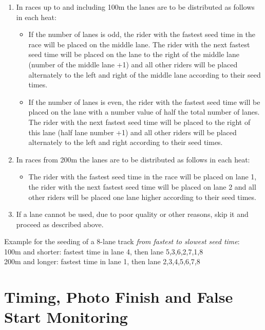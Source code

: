 \begin{enumerate}[leftmargin=1.5em,labelsep=*]
\item In races up to and including 100m the lanes are to be distributed as follows in each heat:
	\begin{itemize}
		\item[$-$] If the number of lanes is odd, the rider with the fastest seed time in the race will be placed on the middle lane.
		The rider with the next fastest seed time will be placed on the lane to the right of the middle lane (number of the middle lane +1) and all other riders will be placed alternately to the left and right of the middle lane according to their seed times.
		\item[$-$] If the number of lanes is even, the rider with the fastest seed time will be placed on the lane with a number value of half the total number of lanes.
		The rider with the next fastest seed time will be placed to the right of this lane (half lane number +1) and all other riders will be placed alternately to the left and right according to their seed times.
	\end{itemize}
	\item In races from 200m the lanes are to be distributed as follows in each heat:
	\begin{itemize}
		\item[$-$] The rider with the fastest seed time in the race will be placed on lane 1, the rider with the next fastest seed time will be placed on lane 2 and all other riders will be placed one lane higher according to their seed times.
	\end{itemize}
	\item If a lane cannot be used, due to poor quality or other reasons, skip it and proceed as described above.
\end{enumerate}

Example for the seeding of a 8-lane track \textit{from fastest to slowest seed time}:\\
100m and shorter: fastest time in lane 4, then lane 5,3,6,2,7,1,8\\
200m and longer: fastest time in lane 1, then lane 2,3,4,5,6,7,8

\section{Timing, Photo Finish and False Start Monitoring}

